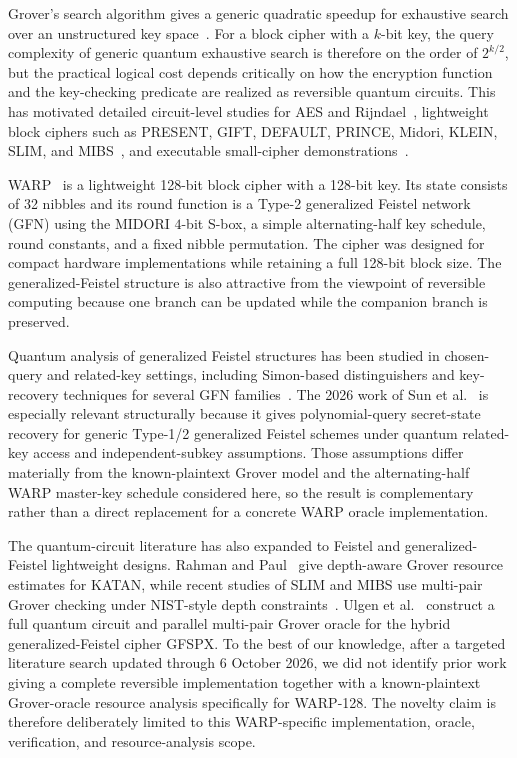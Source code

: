 \documentclass[pdflatex,sn-nature]{sn-jnl}
\theoremstyle{thmstyleone}
\theoremstyle{thmstyletwo}
\begin{document}
Grover's search algorithm gives a generic quadratic speedup for exhaustive search over an unstructured key space~\cite{Grover1996}. For a block cipher with a $k$-bit key, the query complexity of generic quantum exhaustive search is therefore on the order of $2^{k/2}$, but the practical logical cost depends critically on how the encryption function and the key-checking predicate are realized as reversible quantum circuits. This has motivated detailed circuit-level studies for AES and Rijndael~\cite{Grassl2016,Langenberg2020,Jaques2020,Lin2023,SongSeo2026}, lightweight block ciphers such as PRESENT, GIFT, DEFAULT, PRINCE, Midori, KLEIN, SLIM, and MIBS~\cite{Jang2021,JangDefault2025,Akhlaq2024,KLEIN2026,SLIM2025,MIBS2026}, and executable small-cipher demonstrations~\cite{Wang2025,Kiran2026}.

WARP~\cite{WARP2020} is a lightweight 128-bit block cipher with a 128-bit key. Its state consists of 32 nibbles and its round function is a Type-2 generalized Feistel network (GFN) using the MIDORI $4$-bit S-box, a simple alternating-half key schedule, round constants, and a fixed nibble permutation. The cipher was designed for compact hardware implementations while retaining a full 128-bit block size. The generalized-Feistel structure is also attractive from the viewpoint of reversible computing because one branch can be updated while the companion branch is preserved.

Quantum analysis of generalized Feistel structures has been studied in chosen-query and related-key settings, including Simon-based distinguishers and key-recovery techniques for several GFN families~\cite{Dong2019,Hodzic2022,Sun2023,Sun2026}. The 2026 work of Sun et al.~\cite{Sun2026} is especially relevant structurally because it gives polynomial-query secret-state recovery for generic Type-1/2 generalized Feistel schemes under quantum related-key access and independent-subkey assumptions. Those assumptions differ materially from the known-plaintext Grover model and the alternating-half WARP master-key schedule considered here, so the result is complementary rather than a direct replacement for a concrete WARP oracle implementation.

The quantum-circuit literature has also expanded to Feistel and generalized-Feistel lightweight designs. Rahman and Paul~\cite{Rahman2022} give depth-aware Grover resource estimates for KATAN, while recent studies of SLIM and MIBS use multi-pair Grover checking under NIST-style depth constraints~\cite{SLIM2025,MIBS2026}. Ulgen et al.~\cite{Ulgen2026} construct a full quantum circuit and parallel multi-pair Grover oracle for the hybrid generalized-Feistel cipher GFSPX. To the best of our knowledge, after a targeted literature search updated through 6 October 2026, we did not identify prior work giving a complete reversible implementation together with a known-plaintext Grover-oracle resource analysis specifically for WARP-128. The novelty claim is therefore deliberately limited to this WARP-specific implementation, oracle, verification, and resource-analysis scope.
\end{document}

